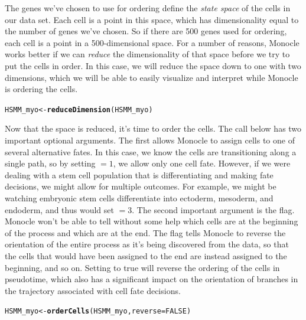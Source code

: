 \documentclass[10pt,oneside]{article}\usepackage[]{graphicx}\usepackage[]{color}
\makeatletter
\newcommand{\hlnum}[1]{\textcolor[rgb]{0.686,0.059,0.569}{#1}}%
\newcommand{\hlstd}[1]{\textcolor[rgb]{0.345,0.345,0.345}{#1}}%
\newcommand{\hlkwb}[1]{\textcolor[rgb]{0.69,0.353,0.396}{#1}}%
\newcommand{\hlkwc}[1]{\textcolor[rgb]{0.333,0.667,0.333}{#1}}%
\newcommand{\hlkwd}[1]{\textcolor[rgb]{0.737,0.353,0.396}{\textbf{#1}}}%
\newenvironment{kframe}{%
 \def\at@end@of@kframe{}%
 \ifinner\ifhmode%
  \def\at@end@of@kframe{\end{minipage}}%
  \begin{minipage}{\columnwidth}%
 \fi\fi%
 \def\FrameCommand##1{\hskip\@totalleftmargin \hskip-\fboxsep
 \colorbox{shadecolor}{##1}\hskip-\fboxsep
     \hskip-\linewidth \hskip-\@totalleftmargin \hskip\columnwidth}%
 \MakeFramed {\advance\hsize-\width
   \@totalleftmargin\z@ \linewidth\hsize
   \@setminipage}}%
 {\par\unskip\endMakeFramed%
 \at@end@of@kframe}
\newenvironment{knitrout}{}{} %
\makeatother
\begin{document}
The genes we've chosen to use for ordering define the \emph{state space} of the cells in our data set.  Each cell is a point in this space, which has dimensionality equal to the number of genes we've chosen.  So if there are 500 genes used for ordering, each cell is a point in a 500-dimensional space.  For a number of reasons, Monocle works better if we can \emph{reduce} the dimensionality of that space before we try to put the cells in order.  In this case, we will reduce the space down to one with two dimensions, which we will be able to easily visualize and interpret while Monocle is ordering the cells.
\begin{knitrout}
\color{fgcolor}\begin{kframe}
\begin{alltt}
\hlstd{HSMM_myo} \hlkwb{<-} \hlkwd{reduceDimension}\hlstd{(HSMM_myo)}
\end{alltt}
\end{kframe}
\end{knitrout}

Now that the space is reduced, it's time to order the cells.  The call below has two important optional arguments.  The first  allows Monocle to assign cells to one of several alternative fates. In this case, we know the cells are transitioning along a single path, so by setting $=1$, we allow only one cell fate. However, if we were dealing with a stem cell population that is differentiating and making fate decisions, we might allow for multiple outcomes. For example, we might be watching embryonic stem cells differentiate into ectoderm, mesoderm, and endoderm, and thus would set $=3$.  The second important argument is the  flag.  Monocle won't be able to tell without some help which cells are at the beginning of the process and which are at the end.  The  flag tells Monocle to reverse the orientation of the entire process as it's being discovered from the data, so that the cells that would have been assigned to the end are instead assigned to the beginning, and so on. Setting  to true will reverse the ordering of the cells in pseudotime, which also has a significant impact on the orientation of branches in the trajectory associated with cell fate decisions.  

\begin{knitrout}
\color{fgcolor}\begin{kframe}
\begin{alltt}
\hlstd{HSMM_myo} \hlkwb{<-} \hlkwd{orderCells}\hlstd{(HSMM_myo,} \hlkwc{reverse}\hlstd{=}\hlnum{FALSE}\hlstd{)}
\end{alltt}
\end{kframe}
\end{knitrout}
\end{document}
